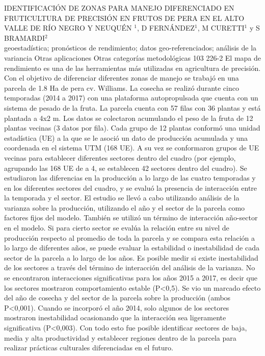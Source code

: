 \A
{IDENTIFICACIÓN DE ZONAS PARA MANEJO DIFERENCIADO EN FRUTICULTURA DE PRECISIÓN EN FRUTOS DE PERA EN EL ALTO VALLE DE RÍO NEGRO Y NEUQUÉN}
{$^1$, D FERNÁNDEZ$^1$, M CURETTI$^1$ y S BRAMARDI$^2$}
{
\\}
{geoestadística; pronósticos de rendimiento; datos geo-referenciados; análisis de la variancia} 
 {Otras aplicaciones} 
 {Otras categorías metodológicas} 
 {103} 
 {226-2}
{El mapa de rendimiento es una de las herramientas más utilizadas en agricultura de precisión. Con el objetivo de diferenciar diferentes zonas de manejo se trabajó en una parcela de 1.8 Ha de pera cv. Williams. La cosecha se realizó durante cinco temporadas (2014 a 2017) con una plataforma autopropulsada que cuenta con un sistema de pesado de la fruta. La parcela cuenta con 57 filas con 36 plantas y está plantada a 4x2 m. Los datos se colectaron acumulando el peso de la fruta de 12 plantas vecinas (3 datos por fila). Cada grupo de 12 plantas conformó una unidad estadística (UE) a la que se le asoció un dato de producción acumulada y una coordenada en el sistema UTM (168 UE). A su vez se conformaron grupos de UE vecinas para establecer diferentes sectores dentro del cuadro (por ejemplo, agrupando las 168 UE de a 4, se establecen 42 sectores dentro del cuadro). Se estudiaron las diferencias en la producción a lo largo de las cuatro temporadas y en los diferentes sectores del cuadro, y se evaluó la presencia de interacción entre la temporada y el sector. El estudio se llevó a cabo utilizando análisis de la varianza sobre la producción, utilizando el año y el sector de la parcela como factores fijos del modelo. También se utilizó un término de interacción año-sector en el modelo. Si para cierto sector se evalúa la relación entre su nivel de producción respecto al promedio de toda la parcela y se compara esta relación a lo largo de diferentes años, se puede evaluar la estabilidad o inestabilidad de cada sector de la parcela a lo largo de los años. Es posible medir si existe inestabilidad de los sectores a través del término de interacción del análisis de la varianza. No se encontraron interacciones significativas para los años 2015 a 2017, es decir que los sectores mostraron comportamiento estable (P<0,5). Se vio un marcado efecto del año de cosecha y del sector de la parcela sobre la producción (ambos P<0,001). Cuando se incorporó el año 2014, solo algunos de los sectores mostraron inestabilidad ocasionando que la interacción sea ligeramente significativa (P<0,003). Con todo esto fue posible identificar sectores de baja, media y alta productividad y establecer regiones dentro de la parcela para realizar prácticas culturales diferenciadas en el futuro.}
